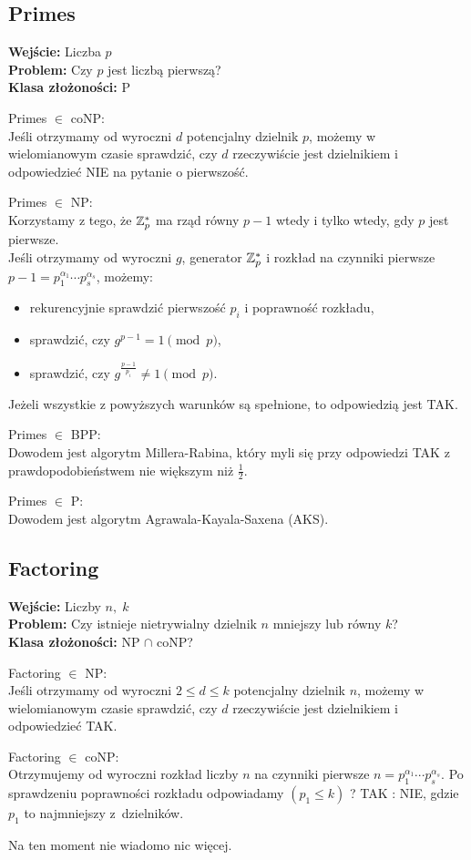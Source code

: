 \subsection{Primes}
\textbf{Wejście:} Liczba \( p \) \\
\textbf{Problem:} Czy \( p \) jest liczbą pierwszą? \\
\textbf{Klasa złożoności:} P

Primes \( \in \) coNP: \\
Jeśli otrzymamy od wyroczni \( d \) potencjalny dzielnik \( p \), możemy w wielomianowym czasie sprawdzić, czy \( d \) rzeczywiście jest dzielnikiem i odpowiedzieć NIE na pytanie o pierwszość.

Primes \( \in \) NP: \\
Korzystamy z tego, że \( \mathbb{Z}_p^* \) ma rząd równy \( p-1 \) wtedy i tylko wtedy, gdy \( p \) jest pierwsze. \\
Jeśli otrzymamy od wyroczni \( g \), generator \( \mathbb{Z}_p^* \) i rozkład na czynniki pierwsze \( p-1 = p_1^{\alpha_1} \cdots p_s^{\alpha_s} \), możemy:
\begin{itemize}
    \item rekurencyjnie sprawdzić pierwszość \( p_i \) i poprawność rozkładu,
    \item sprawdzić, czy \( g^{p-1} = 1 \pmod{p} \),
    \item sprawdzić, czy \( g^{\frac{p-1}{p_i}} \neq 1 \pmod{p} \).
\end{itemize}
Jeżeli wszystkie z powyższych warunków są spełnione, to odpowiedzią jest TAK.

\newpage
Primes \( \in \) BPP: \\
Dowodem jest algorytm Millera-Rabina, który myli się przy odpowiedzi TAK z prawdopodobieństwem nie większym niż \( \frac{1}{2} \).

Primes \( \in \) P: \\
Dowodem jest algorytm Agrawala-Kayala-Saxena (AKS).

\subsection{Factoring}
\textbf{Wejście:} Liczby \( n,\; k \) \\
\textbf{Problem:} Czy istnieje nietrywialny dzielnik \( n \) mniejszy lub równy \( k \)? \\
\textbf{Klasa złożoności:} NP \( \cap \) coNP?

Factoring \( \in \) NP: \\
Jeśli otrzymamy od wyroczni \( 2 \leq d \leq k \) potencjalny dzielnik \( n \), możemy w wielomianowym czasie sprawdzić, czy \( d \) rzeczywiście jest dzielnikiem i odpowiedzieć TAK.

Factoring \( \in \) coNP: \\
Otrzymujemy od wyroczni rozkład liczby \( n \) na czynniki pierwsze \( n = p_1^{\alpha_1} \cdots p_s^{\alpha_s} \). Po sprawdzeniu poprawności rozkładu odpowiadamy \( (p_1 \leq k) \) ? TAK : NIE, gdzie \( p_1 \) to najmniejszy z~dzielników.

Na ten moment nie wiadomo nic więcej.